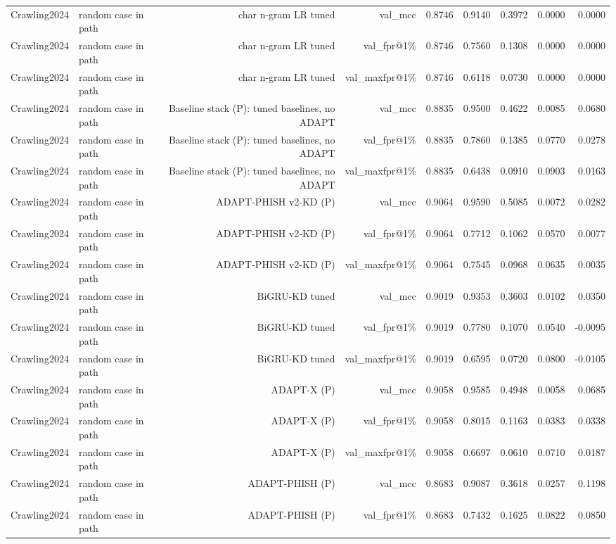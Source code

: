 \begin{table}[t]
\begin{tabular}{llrrrrrrr}
Crawling2024 & random case in path & char n-gram LR tuned & val\_mcc & 0.8746 & 0.9140 & 0.3972 & 0.0000 & 0.0000 \\
Crawling2024 & random case in path & char n-gram LR tuned & val\_fpr@1\% & 0.8746 & 0.7560 & 0.1308 & 0.0000 & 0.0000 \\
Crawling2024 & random case in path & char n-gram LR tuned & val\_maxfpr@1\% & 0.8746 & 0.6118 & 0.0730 & 0.0000 & 0.0000 \\
Crawling2024 & random case in path & Baseline stack (P): tuned baselines, no ADAPT & val\_mcc & 0.8835 & 0.9500 & 0.4622 & 0.0085 & 0.0680 \\
Crawling2024 & random case in path & Baseline stack (P): tuned baselines, no ADAPT & val\_fpr@1\% & 0.8835 & 0.7860 & 0.1385 & 0.0770 & 0.0278 \\
Crawling2024 & random case in path & Baseline stack (P): tuned baselines, no ADAPT & val\_maxfpr@1\% & 0.8835 & 0.6438 & 0.0910 & 0.0903 & 0.0163 \\
Crawling2024 & random case in path & ADAPT-PHISH v2-KD (P) & val\_mcc & 0.9064 & 0.9590 & 0.5085 & 0.0072 & 0.0282 \\
Crawling2024 & random case in path & ADAPT-PHISH v2-KD (P) & val\_fpr@1\% & 0.9064 & 0.7712 & 0.1062 & 0.0570 & 0.0077 \\
Crawling2024 & random case in path & ADAPT-PHISH v2-KD (P) & val\_maxfpr@1\% & 0.9064 & 0.7545 & 0.0968 & 0.0635 & 0.0035 \\
Crawling2024 & random case in path & BiGRU-KD tuned & val\_mcc & 0.9019 & 0.9353 & 0.3603 & 0.0102 & 0.0350 \\
Crawling2024 & random case in path & BiGRU-KD tuned & val\_fpr@1\% & 0.9019 & 0.7780 & 0.1070 & 0.0540 & -0.0095 \\
Crawling2024 & random case in path & BiGRU-KD tuned & val\_maxfpr@1\% & 0.9019 & 0.6595 & 0.0720 & 0.0800 & -0.0105 \\
Crawling2024 & random case in path & ADAPT-X (P) & val\_mcc & 0.9058 & 0.9585 & 0.4948 & 0.0058 & 0.0685 \\
Crawling2024 & random case in path & ADAPT-X (P) & val\_fpr@1\% & 0.9058 & 0.8015 & 0.1163 & 0.0383 & 0.0338 \\
Crawling2024 & random case in path & ADAPT-X (P) & val\_maxfpr@1\% & 0.9058 & 0.6697 & 0.0610 & 0.0710 & 0.0187 \\
Crawling2024 & random case in path & ADAPT-PHISH (P) & val\_mcc & 0.8683 & 0.9087 & 0.3618 & 0.0257 & 0.1198 \\
Crawling2024 & random case in path & ADAPT-PHISH (P) & val\_fpr@1\% & 0.8683 & 0.7432 & 0.1625 & 0.0822 & 0.0850 \\

\end{tabular}
\end{table}
